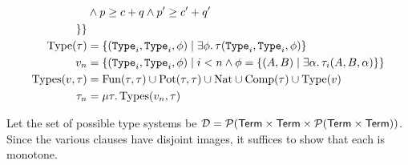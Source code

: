 \begin{align*}
  &\land p \ge c + q \land p' \ge c' + q'\\
  \}
  \}\\
  \text{Type}(\tau) &= \{(\mathtt{Type}_{i}, \mathtt{Type}_{i}, \phi) \mid \exists \phi.\, \tau(\mathtt{Type}_{i}, \mathtt{Type}_{i}, \phi)\}\\
  v_n &= \{(\mathtt{Type}_{i}, \mathtt{Type}_{i}, \phi) \mid i < n \land \phi = \{(A,B) \mid \exists \alpha.\, \tau_i(A,B,\alpha)\}\}\\
  \text{Types}(v,\tau) &= \text{Fun}(\tau,\tau) \cup \text{Pot}(\tau,\tau) \cup \text{Nat} \cup \text{Comp}(\tau) \cup \text{Type}(v)\\
  \tau_n &= \mu \tau.\, \text{Types}(v_n,\tau)
\end{align*}

Let the set of possible type systems be $\mathcal{D} = 
\mathcal{P}(\mathsf{Term} \times \mathsf{Term} \times \mathcal{P}(\mathsf{Term} \times \mathsf{Term}))$.
Since the various clauses have disjoint images, it suffices to show that each is monotone.

\iffalse
\begin{lemma}\label{lemma:monotone}
For all $v \in \mathcal{D}$, $f : \mathcal{D} \to \mathcal{D}, \tau \mapsto \text{Types}(v,\tau)$ is a monotone function.
\end{lemma}

\begin{proof}

\begin{itemize}
\item $\text{Fun}$:\\
Suppose $\tau \subseteq \tau'$. NTS $\text{Fun}(\tau,\tau) \subseteq \text{Fun}(\tau',\tau')$. 
Suppose $(\arr{A}{\varphi}{B}{\varrho}, \arr{A'}{\varphi'}{B'}{\varrho'}, \phi)  \in \text{Fun}(\tau,\tau)$. 
Unrolling the definition, we know:
\begin{enumerate}
  \item there is a $\alpha$ s.t. \sameType{A}{A'}{\alpha}{\tau}. Then by assumption, \sameType{A}{A'}{\alpha}{\tau'}. 
  \item there is a $\beta$ s.t. \fact{\sameTypeOne{a}{\alpha}{B}{B'}{\beta}{\tau}}{1}. We show
\sameTypeOne{a}{\alpha}{B}{B'}{\beta}{\tau'}. Let $v,v'$ s.t. $\alpha(v,v')$, and show 
\sameType{[v/a]B}{[v'/a]B'}{\beta_{v,v'}}{\tau'}. But this holds by \applyAss{1}.
\end{enumerate}
Since the next three constraints are determined by $\alpha$ and $\beta$ which did not change, we conclude 
$(\arr{A}{\varphi}{B}{\varrho}, \arr{A'}{\varphi'}{B'}{\varrho'}, \phi)  \in \text{Fun}(\tau',\tau')$.
\end{itemize}
\end{proof}
\fi

